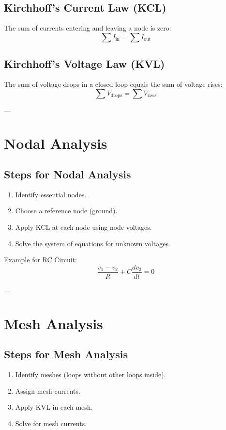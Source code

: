 \documentclass[9pt]{article}
\begin{document}
\begin{multicols}{2}
\subsection{Kirchhoff's Current Law (KCL)}
The sum of currents entering and leaving a node is zero:
\[
\sum I_{\text{in}} = \sum I_{\text{out}}
\]

\subsection{Kirchhoff's Voltage Law (KVL)}
The sum of voltage drops in a closed loop equals the sum of voltage rises:
\[
\sum V_{\text{drops}} = \sum V_{\text{rises}}
\]

---

\section{Nodal Analysis}

\subsection{Steps for Nodal Analysis}
\begin{enumerate}\itemsep0pt
    \item Identify essential nodes.
    \item Choose a reference node (ground).
    \item Apply KCL at each node using node voltages.
    \item Solve the system of equations for unknown voltages.
\end{enumerate}

Example for RC Circuit:
\[
\frac{v_1 - v_2}{R} + C\frac{dv_2}{dt} = 0
\]

---

\section{Mesh Analysis}

\subsection{Steps for Mesh Analysis}
\begin{enumerate}\itemsep0pt
    \item Identify meshes (loops without other loops inside).
    \item Assign mesh currents.
    \item Apply KVL in each mesh.
    \item Solve for mesh currents.
\end{enumerate}


\end{multicols}
\end{document}
